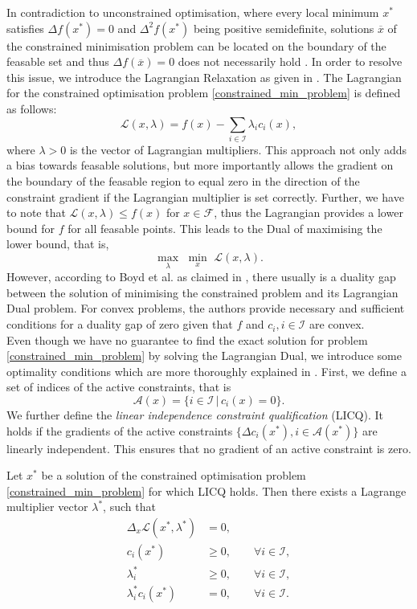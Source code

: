 \indent In contradiction to unconstrained optimisation, where every local minimum $x^*$ satisfies $\Delta f(x^*) = 0$ and $\Delta^2 f(x^*)$ being positive semidefinite, solutions $\overline{x}$ of the constrained minimisation problem can be located on the boundary of the feasable set and thus $\Delta f(\overline{x}) = 0$ does not necessarily hold \cite{NoceWrig06}. In order to resolve this issue, we introduce the Lagrangian Relaxation as given in \cite{Lemarechal:2000:LR:647776.734757}. The Lagrangian for the constrained optimisation problem \eqref{constrained_min_problem} is defined as follows:
\[ \mathcal{L}(x, \lambda) = f(x) - \sum_{i \in \mathcal{I}} \lambda_i c_i(x), \]
where $\lambda > 0$ is the vector of Lagrangian multipliers. This approach not only adds a bias towards feasable solutions, but more importantly allows the gradient on the boundary of the feasable region to equal zero in the direction of the constraint gradient if the Lagrangian multiplier is set correctly. Further, we have to note that $\mathcal{L}(x, \lambda) \leq f(x)$ for $x \in \mathcal{F}$, thus the Lagrangian provides a lower bound for $f$ for all feasable points. This leads to the Dual of maximising the lower bound, that is,
\[ \underset{\lambda}{\max}\,\, \underset{x}{\min}\,\, \mathcal{L}(x, \lambda). \]
However, according to Boyd et al. as claimed in \cite{Boyd:2004:CO:993483}, there usually is a duality gap between the solution of minimising the constrained problem and its Lagrangian Dual problem. For convex problems, the authors provide necessary and sufficient conditions for a duality gap of zero given that $f$ and $c_i, i \in \mathcal{I}$ are convex.\\
\indent Even though we have no guarantee to find the exact solution for problem \eqref{constrained_min_problem} by solving the Lagrangian Dual, we introduce some optimality conditions which are more thoroughly explained in \cite{NoceWrig06}. First, we define a set of indices of the active constraints, that is
\[ \mathcal{A}(x) = \{ i \in \mathcal{I} \,|\, c_i(x) = 0 \}. \]
We further define the \textit{linear independence constraint qualification} (LICQ). It holds if the gradients of the active constraints $\{ \Delta c_i(x^*), i \in \mathcal{A}(x^*) \}$ are linearly independent. This ensures that no gradient of an active constraint is zero.
\begin{theorem}$\,$\\
	\label{theorem:kkt}
Let $x^*$ be a solution of the constrained optimisation problem \eqref{constrained_min_problem} for which LICQ holds. Then there exists a Lagrange multiplier vector $\lambda^*$, such that
\begin{subequations}
	\label{eq:kkt}
	\begin{align}
	\Delta_x \mathcal{L}(x^*, \lambda^*) &= 0,\\
	c_i(x^*) &\geq 0, \qquad \forall i \in \mathcal{I},\\
	\lambda^*_i &\geq 0, \qquad \forall i \in \mathcal{I},\\
	\lambda^*_i  c_i(x^*) &= 0, \qquad \forall i \in \mathcal{I}.
	\end{align}
\end{subequations}
\end{theorem}

